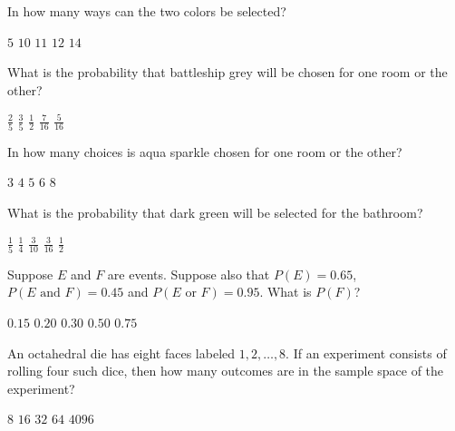 \documentclass[answers,12pt]{exam}
\begin{document}
\begin{questions}
\question\label{FirstColor}
In how many ways can the two colors be selected?\\
\begin{oneparchoices}
\choice $5$ %
\correctchoice $10$
\choice $11$ %
\choice $12$ %
\choice $14$ %
\end{oneparchoices}

\question
What is the probability that battleship grey will be chosen
for one room or the other?\\
\begin{oneparchoices}
\choice $\frac{2}{5}$ %
\correctchoice $\frac{3}{5}$
\choice $\frac{1}{2}$ %
\choice $\frac{7}{16}$ %
\choice $\frac{5}{16}$ %
\end{oneparchoices}

\question
In how many choices is aqua sparkle chosen for
one room or the other?\\
\begin{oneparchoices}
\choice $3$
\correctchoice $4$
\choice $5$ %
\choice $6$ %
\choice $8$
\end{oneparchoices}

\question\label{LastColor}
What is the probability that dark green will be selected
for the bathroom?\\
\begin{oneparchoices}
\correctchoice $\frac{1}{5}$
\choice $\frac{1}{4}$ %
\choice $\frac{3}{10}$ %
\choice $\frac{3}{16}$ %
\choice $\frac{1}{2}$ %
\end{oneparchoices}

\question Suppose $E$ and $F$ are events.
Suppose also that $P\left(E\right)=0.65$,
$P\left(\text{$E$ and $F$}\right)=0.45$
and $P\left(\text{$E$ or $F$}\right)=0.95$. What
is $P\left(F\right)$?\\
\begin{oneparchoices}
\choice $0.15$ %
\choice $0.20$ %
\choice $0.30$ %
\choice $0.50$ %
\correctchoice $0.75$
\end{oneparchoices}

\question An octahedral die has eight faces labeled $1,2,\ldots,8$.
If an experiment consists of rolling four such dice, then how
many outcomes are in the sample space of the experiment?\\
\begin{oneparchoices}
\choice $8$ %
\choice $16$
\choice $32$ %
\choice $64$ %
\correctchoice $4096$
\end{oneparchoices}


\end{questions}
\end{document}
